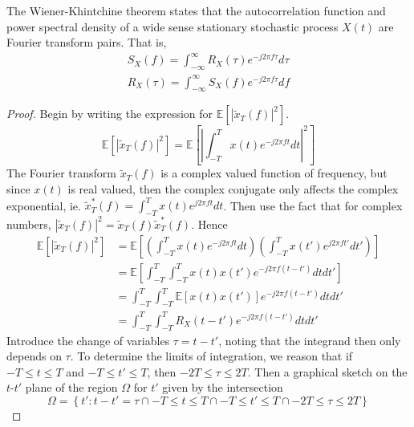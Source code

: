 \documentclass[11pt]{report} %
\begin{document}
The Wiener-Khintchine theorem states that the autocorrelation function and power spectral density of a wide sense stationary stochastic process $X\left(t\right)$ are Fourier transform pairs. That is,
\begin{gather}
S_{X}\left(f\right) = \int_{-\infty}^{\infty}R_{X}\left(\tau\right)e^{-j2\pi f\tau}d\tau \\
R_{X}\left(\tau\right) = \int_{-\infty}^{\infty}S_{X}\left(f\right)e^{-j2\pi f\tau}df
\end{gather}
\begin{proof}
Begin by writing the expression for $\mathbb{E}\left[\left|\widetilde{x}_{T}\left(f\right)\right|^{2}\right]$.
\begin{equation}
\mathbb{E}\left[\left|\widetilde{x}_{T}\left(f\right)\right|^{2}\right] = \mathbb{E}\left[\left|\int_{-T}^{T}x\left(t\right)e^{-j2\pi ft}dt\right|^{2}\right]
\end{equation}
The Fourier transform $\widetilde{x}_{T}\left(f\right)$ is a complex valued function of frequency, but since $x\left(t\right)$ is real valued, then the complex conjugate only affects the complex exponential, ie. $\widetilde{x}_{T}^{*}\left(f\right) = \int_{-T}^{T}x\left(t\right)e^{j2\pi ft}dt$. Then use the fact that for complex numbers, $\left|\widetilde{x}_{T}\left(f\right)\right|^{2} = \widetilde{x}_{T}\left(f\right)\widetilde{x}_{T}^{*}\left(f\right)$. Hence
\begin{align}
\mathbb{E}\left[\left|\widetilde{x}_{T}\left(f\right)\right|^{2}\right] &= \mathbb{E}\left[\left(\int_{-T}^{T}x\left(t\right)e^{-j2\pi ft}dt\right)\left(\int_{-T}^{T}x\left(t'\right)e^{j2\pi ft'}dt'\right)\right] \\
&= \mathbb{E}\left[\int_{-T}^{T}\int_{-T}^{T}x\left(t\right)x\left(t'\right)e^{-j2\pi f\left(t-t'\right)}dtdt'\right] \\
&= \int_{-T}^{T}\int_{-T}^{T}\mathbb{E}\left[x\left(t\right)x\left(t'\right)\right]e^{-j2\pi f\left(t-t'\right)}dtdt' \\
&= \int_{-T}^{T}\int_{-T}^{T}R_{X}\left(t-t'\right)e^{-j2\pi f\left(t-t'\right)}dtdt'
\end{align}
Introduce the change of variables $\tau = t - t'$, noting that the integrand then only depends on $\tau$. To determine the limits of integration, we reason that if $-T\leq t \leq T$ and $-T \leq t'\leq T$, then $-2T \leq \tau \leq 2T$. Then a graphical sketch on the $t$-$t'$ plane of the region $\Omega$ for $t'$ given by the intersection
\begin{equation}
\Omega = \left\{t': t - t' = \tau \cap -T\leq t \leq T \cap -T \leq t'\leq T \cap -2T \leq \tau \leq 2T\right\}

\end{equation}
\end{proof}
\end{document}
